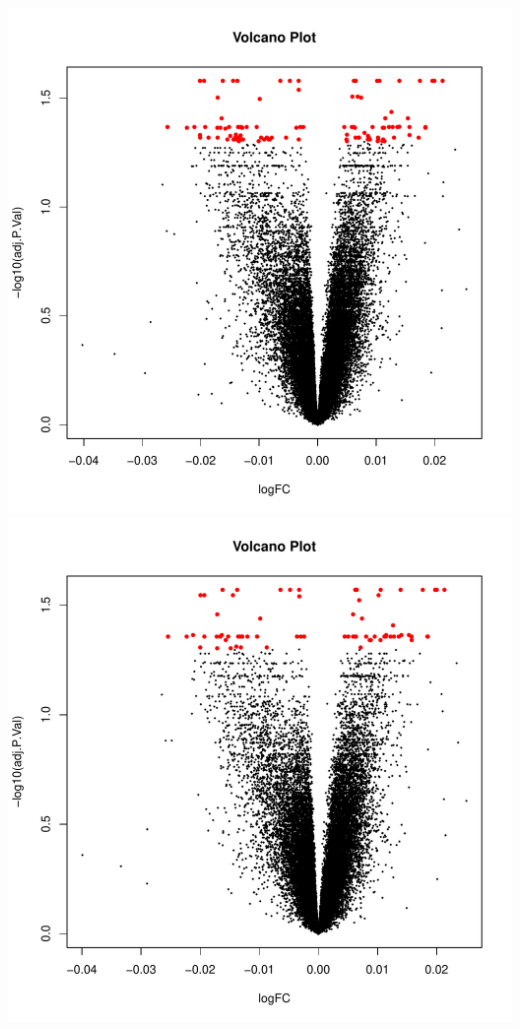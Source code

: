 \documentclass[]{article}
\begin{document}
\includegraphics{./Vplot.Mod1_Mono_ageContinuous.pdf}
\includegraphics{./Vplot.Mod2_Mono_ageContinuous_sex.pdf}
\end{document}
